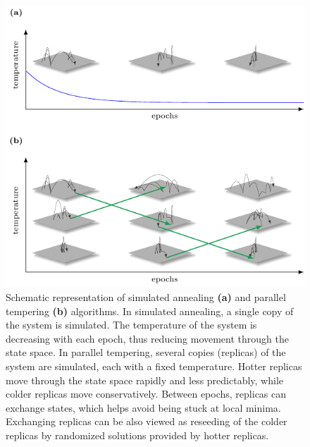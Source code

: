 \begin{figure}
    \centering
    \includegraphics[width=\textwidth]{figures/pt_and_sa.pdf}
    \caption{Schematic representation of simulated annealing \textbf{(a)} and parallel tempering \textbf{(b)} algorithms. In simulated annealing, a single copy of the system is simulated. The temperature of the system is decreasing with each epoch, thus reducing movement through the state space. In parallel tempering, several copies (replicas) of the system are simulated, each with a fixed temperature. Hotter replicas move through the state space rapidly and less predictably, while colder replicas move conservatively. Between epochs, replicas can exchange states, which helps avoid being stuck at local minima. Exchanging replicas can be also viewed as reseeding of the colder replicas by randomized solutions provided by hotter replicas.}
    \label{fig:my_label}
\end{figure}


